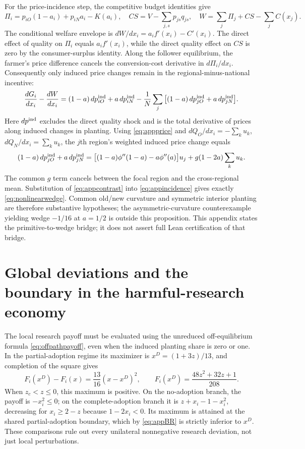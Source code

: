 \documentclass[11pt]{article}
\begin{document}
For the price-incidence step, the competitive budget identities give
\[
\Pi_i=p_{iO}(1-a_i)+p_{iN}a_i-K(a_i),\quad
CS=V-\sum_{j,s}p_{js}q_{js},\quad
W=\sum_j\Pi_j+CS-\sum_j C(x_j).
\]
The conditional welfare envelope is $dW/dx_i=a_if'(x_i)-C'(x_i)$. The direct effect of quality on $\Pi_i$ equals $a_if'(x_i)$, while the direct quality effect on $CS$ is zero by the consumer-surplus identity. Along the follower equilibrium, the farmer's price difference cancels the conversion-cost derivative in $d\Pi_i/dx_i$. Consequently only induced price changes remain in the regional-minus-national incentive:
\begin{equation}
\frac{dG_i}{dx_i}-\frac{dW}{dx_i}
=(1-a)\,dp_{iO}^{\rm ind}+a\,dp_{iN}^{\rm ind}
-\frac1N\sum_j\big[(1-a)\,dp_{jO}^{\rm ind}
+a\,dp_{jN}^{\rm ind}\big].
\label{eq:appincidence}
\end{equation}
Here $dp^{\rm ind}$ excludes the direct quality shock and is the total derivative of prices along induced changes in planting. Using \eqref{eq:appprice} and $dQ_O/dx_i=-\sum_k u_k$, $dQ_N/dx_i=\sum_k u_k$, the $j$th region's weighted induced price change equals
\[
(1-a)\,dp_{jO}^{\rm ind}+a\,dp_{jN}^{\rm ind}
=\big[(1-a)\phi''(1-a)-a\phi''(a)\big]u_j
 +g(1-2a)\sum_k u_k.
\]
The common $g$ term cancels between the focal region and the cross-regional mean. Substitution of \eqref{eq:appcontrast} into \eqref{eq:appincidence} gives exactly \eqref{eq:nonlinearwedge}. Common old/new curvature and symmetric interior planting are therefore substantive hypotheses; the asymmetric-curvature counterexample yielding wedge $-1/16$ at $a=1/2$ is outside this proposition. This appendix states the primitive-to-wedge bridge; it does not assert full Lean certification of that bridge.

\section{Global deviations and the boundary in the harmful-research economy}
\label{app:globalP3}
The local research payoff must be evaluated using the unreduced off-equilibrium formula \eqref{eq:offpathpayoff}, even when the induced planting share is zero or one. In the partial-adoption regime its maximizer is $x^D=(1+3z)/13$, and completion of the square gives
\begin{equation}
 F_i(x^D)-F_i(x)=\frac{13}{16}(x-x^D)^2,\qquad
 F_i(x^D)=\frac{48z^2+32z+1}{208}.
 \label{eq:appBR}
\end{equation}
When $z_c<z\leq0$, this maximum is positive. On the no-adoption branch, the payoff is $-x_i^2\leq0$; on the complete-adoption branch it is $z+x_i-1-x_i^2$, decreasing for $x_i\geq2-z$ because $1-2x_i<0$. Its maximum is attained at the shared partial-adoption boundary, which by \eqref{eq:appBR} is strictly inferior to $x^D$. These comparisons rule out every unilateral nonnegative research deviation, not just local perturbations.
\end{document}
